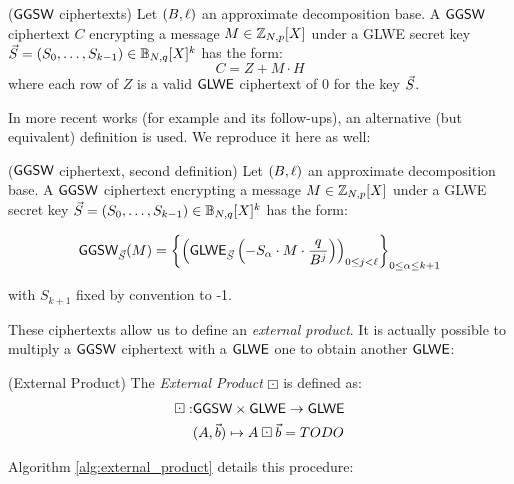 \begin{definition}($\textsf{GGSW}$ ciphertexts)
	Let $(B, \ell)$ an approximate decomposition base. A $\textsf{GGSW}$ ciphertext $C$ encrypting a message $M \in \mathbb{Z}_{N,p}[X]$ under a GLWE secret key $\vec S =  (S_0, \dots, S_{k-1}) \in \mathbb{B}_{N, q}[X]^k$ has the form:
	\begin{equation*}
		C = Z + M \cdot H
	\end{equation*}
	where each row of $Z$ is a valid $\textsf{GLWE}$ ciphertext of 0 for the key $\vec S$. 
	
\end{definition}


In more recent works (for example \cite{AC:CLOT21} and its follow-ups), an alternative (but equivalent) definition is used. We reproduce it here as well:

\begin{definition}($\textsf{GGSW}$ ciphertext, second definition)
	Let $(B, \ell)$ an approximate decomposition base. A $\textsf{GGSW}$ ciphertext encrypting a message $M \in \mathbb{Z}_{N,p}[X]$ under a GLWE secret key $\vec S =  (S_0, \dots, S_{k-1}) \in \mathbb{B}_{N, q}[X]^k$ has the form:
	
	\begin{equation*}
		\textsf{GGSW}_{\vec S}(M) = \left \lbrace \left ( \textsf{GLWE}_{\vec S}\left (-S_\alpha \cdot M \cdot \frac{q}{B^j} \right) \right )_{0 \le j < \ell} \right \rbrace_{0\le \alpha \le k+1}
	\end{equation*}
	
	with $S_{k+1}$ fixed by convention to -1.
\end{definition}


These ciphertexts allow us to define an \textit{external product}. It is actually possible to multiply a $\textsf{GGSW}$ ciphertext with a $\textsf{GLWE}$ one to obtain another $\textsf{GLWE}$:

\begin{definition}(External Product)
	The \textit{External Product} $\boxdot$ is defined as:
	\begin{align*}
		\boxdot: & \textsf{GGSW} \times \textsf{GLWE} \rightarrow \textsf{GLWE}\\
		& (A, \vec b) \mapsto A \boxdot \vec b = TODO\\
	\end{align*}
\end{definition}


Algorithm \ref{alg:external_product} details this procedure:






